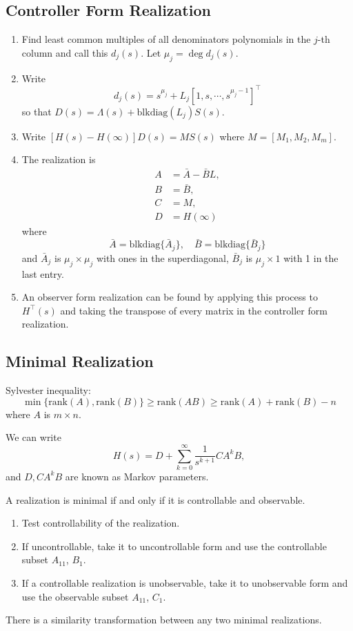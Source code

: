 \documentclass{report}
\begin{document}
\subsection{Controller Form Realization}
\begin{enumerate}
  \item{
    Find least common multiples of all denominators polynomials in the
    $j$-th column and call this $d_j(s)$. Let $\mu_j = \deg d_j(s)$.
  }
  \item{
    Write
    $$
    d_j(s) =
    s^{\mu_j} + L_j [1, s, \cdots, s^{\mu_j - 1}]^\top
    $$
    so that $D(s) = \Lambda(s) + \mathrm{blkdiag}(L_j) S(s)$.
  }
  \item{
    Write $[H(s) - H(\infty)]D(s) = MS(s)$ where
    $M = [M_1, M_2, M_m]$.
  }
  \item{
    The realization is
    \begin{align*}
      A &= \bar{A} - \bar{B} L, \\
      B &= \bar{B}, \\
      C &= M, \\
      D &= H(\infty)
    \end{align*}
    where
    $$
    \bar{A} = \mathrm{blkdiag}\{\bar{A}_j\}, \quad
    \bar{B} = \mathrm{blkdiag}\{\bar{B}_j\}
    $$
    and $\bar{A}_j$ is $\mu_j \times \mu_j$ with ones in the
    superdiagonal, $\bar{B}_j$ is $\mu_j \times 1$ with 1 in the last entry.
  }
  \item{
    An observer form realization can be found by applying this process
    to $H^\top(s)$ and taking the transpose of every matrix in the
    controller form realization.
  }
\end{enumerate}

\subsection{Minimal Realization}
Sylvester inequality:
$$
     \min\{\mathrm{rank}(A), \mathrm{rank}(B)\}
\geq \mathrm{rank}(AB)
\geq \mathrm{rank}(A) + \mathrm{rank}(B) - n
$$
where $A$ is $m \times n$.

We can write
$$
H(s) = D + \sum_{k=0}^{\infty} \frac{1}{s^{k+1}} C A^k B,
$$
and $D, C A^k B$ are known as Markov parameters.

A realization is minimal if and only if it is controllable and observable.
\begin{enumerate}
  \item{
    Test controllability of the realization.
  }
  \item{
    If uncontrollable, take it to uncontrollable form and use the
    controllable subset $A_{11}$, $B_1$.
  }
  \item{
    If a controllable realization is unobservable, take it to
    unobservable form and use the observable subset
    $A_{11}$, $C_1$.
  }
\end{enumerate}
There is a similarity transformation between any two minimal realizations.
\end{document}
